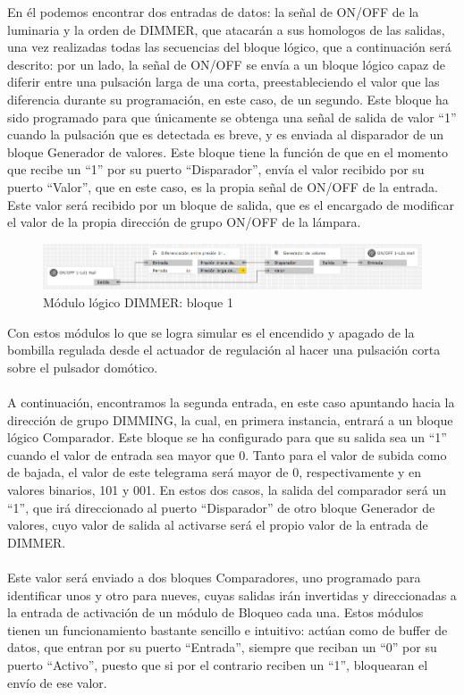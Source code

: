 En él podemos encontrar dos entradas de datos: la señal de ON/OFF de la luminaria y la orden de DIMMER, que atacarán a sus homologos de las salidas, una vez realizadas todas las secuencias del bloque lógico, que a continuación será descrito: por un lado, la señal de ON/OFF se envía a un bloque lógico capaz de diferir entre una pulsación larga de una corta, preestableciendo el valor que las diferencia durante su programación, en este caso, de un segundo. Este bloque ha sido programado para que únicamente se obtenga una señal de salida de valor “1” cuando la pulsación que es detectada es breve, y es enviada al disparador de un bloque Generador de valores. Este bloque tiene la función de que en el momento que recibe un “1” por su puerto “Disparador”, envía el valor recibido por su puerto “Valor”, que en este caso, es la propia señal de ON/OFF de la entrada. Este valor será recibido por un bloque de salida, que es el encargado de modificar el valor de la propia dirección de grupo ON/OFF de la lámpara.
\begin{center}
\begin{figure}[H]
\includegraphics[width=1\textwidth]{figures/log_dimm_b1.png}   
\caption{Módulo lógico DIMMER: bloque 1}
\label{fig:log_dimm_b1}
\end{figure}
\end{center}
Con estos módulos lo que se logra simular es el encendido y apagado de la bombilla regulada desde el actuador de regulación al hacer una pulsación corta sobre el pulsador domótico.\\\\
A continuación, encontramos la segunda entrada, en este caso apuntando hacia la dirección de grupo DIMMING, la cual, en primera instancia, entrará a un bloque lógico Comparador. Este bloque se ha configurado para que su salida sea un “1” cuando el valor de entrada sea mayor que 0. Tanto para el valor de subida como de bajada, el valor de este telegrama será mayor de 0, respectivamente y en valores binarios, 101 y 001. En estos dos  casos, la salida del comparador será un “1”, que irá direccionado al puerto “Disparador” de otro bloque Generador de valores, cuyo valor de salida al activarse será el propio valor de la entrada de DIMMER. 
\\\\ Este valor será enviado a dos bloques Comparadores, uno programado para identificar unos y otro para nueves, cuyas salidas irán invertidas y direccionadas a la entrada de activación de un módulo de Bloqueo cada una. Estos módulos tienen un funcionamiento bastante sencillo e intuitivo: actúan como de buffer de datos, que entran por su puerto “Entrada”, siempre que reciban un “0” por su puerto “Activo”, puesto que si por el contrario reciben un “1”, bloquearan el envío de ese valor. 
